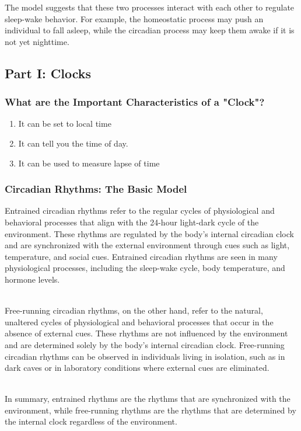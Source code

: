 \begin{itemize}
\begin{itemize}
The model suggests that these two processes interact with each other to regulate sleep-wake behavior. For example, the homeostatic process may push an individual to fall asleep, while the circadian process may keep them awake if it is not yet nighttime.

\subsection{Part I: Clocks}
\subsubsection{What are the Important Characteristics of a "Clock"?}
\begin{enumerate}
    \item It can be set to local time
\item It can tell you the time of day.
\item It can be used to measure lapse of time

\end{enumerate}

\subsubsection{Circadian Rhythms: The Basic Model}
Entrained circadian rhythms refer to the regular cycles of physiological and behavioral processes that align with the 24-hour light-dark cycle of the environment. These rhythms are regulated by the body's internal circadian clock and are synchronized with the external environment through cues such as light, temperature, and social cues. Entrained circadian rhythms are seen in many physiological processes, including the sleep-wake cycle, body temperature, and hormone levels.

\\Free-running circadian rhythms, on the other hand, refer to the natural, unaltered cycles of physiological and behavioral processes that occur in the absence of external cues. These rhythms are not influenced by the environment and are determined solely by the body's internal circadian clock. Free-running circadian rhythms can be observed in individuals living in isolation, such as in dark caves or in laboratory conditions where external cues are eliminated.

\\In summary, entrained rhythms are the rhythms that are synchronized with the environment, while free-running rhythms are the rhythms that are determined by the internal clock regardless of the environment.


\end{itemize}
\end{itemize}
